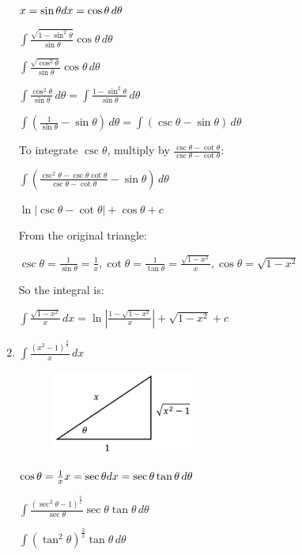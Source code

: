 \documentclass[../main.tex]{subfiles}
\begin{document}
\begin{enumerate}
    \(x=\sin{\theta}\\
    dx=\cos{\theta}\,d\theta\)

    \(\int \frac{\sqrt{1-\sin^2{\theta}}}{\sin{\theta}}\cos{\theta}\,d\theta\)

    \(\int \frac{\sqrt{\cos^2{\theta}}}{\sin{\theta}}\cos{\theta}\,d\theta\)

    \(\int \frac{\cos^2{\theta}}{\sin{\theta}}\,d\theta=\int \frac{1-\sin^2{\theta}}{\sin{\theta}}\,d\theta\)

    \(\int (\frac{1}{\sin{\theta}}-\sin{\theta})\,d\theta=\int (\csc{\theta}-\sin{\theta})\,d\theta\)

    To integrate \(\csc{\theta}\), multiply by \(\frac{\csc{\theta}-\cot{\theta}}{\csc{\theta}-\cot{\theta}}\):

    \(\int (\frac{\csc^2{\theta}-\csc{\theta}\cot{\theta}}{\csc{\theta}-\cot{\theta}}-\sin{\theta})\,d\theta\)

    \(\ln{|\csc{\theta}-\cot{\theta}|+\cos{\theta}}+c\)

    From the original triangle:

    \(\csc{\theta}=\frac{1}{\sin{\theta}}=\frac{1}{x}, \cot{\theta}=\frac{1}{\tan{\theta}}=\frac{\sqrt{1-x^2}}{x}, \cos{\theta}=\sqrt{1-x^2}\)

    So the integral is:

    \(\int \frac{\sqrt{1-x^2}}{x}\,dx=\ln{|\frac{1-\sqrt{1-x^2}}{x}|}+\sqrt{1-x^2}+c\)

    \item 
    \(\int \frac{(x^2-1)^{\frac{3}{2}}}{x}\,dx\)
    \begin{figure}[h]
        \includegraphics{images/trigsuba10.png}
    \end{figure}

    \(\cos{\theta}=\frac{1}{x}\\
    x=\sec{\theta}\\
    dx=\sec{\theta}\tan{\theta}\,d\theta\)

    \(\int \frac{(\sec^2{\theta}-1)^{\frac{3}{2}}}{\sec{\theta}}\sec{\theta}\tan{\theta}\,d\theta\)

    \(\int (\tan^2{\theta})^{\frac{3}{2}}\tan{\theta}\,d\theta\)


\end{enumerate}
\end{document}
